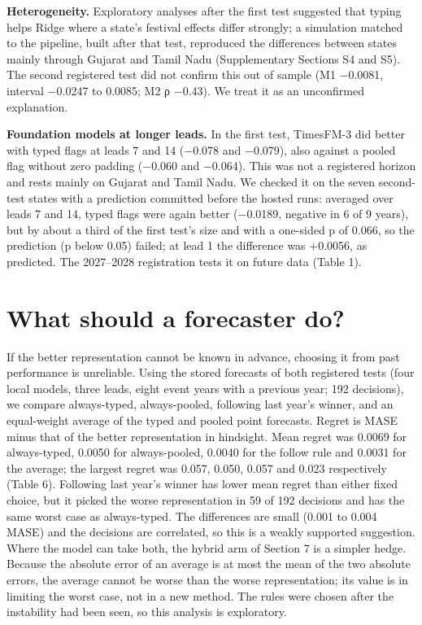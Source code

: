 \documentclass[review,12pt,authoryear]{elsarticle}
\begin{document}
\textbf{Heterogeneity.} Exploratory analyses after the first test suggested that typing helps Ridge where a state's festival effects differ strongly; a simulation matched to the pipeline, built after that test, reproduced the differences between states mainly through Gujarat and Tamil Nadu (Supplementary Sections S4 and S5). The second registered test did not confirm this out of sample (M1 −0.0081, interval −0.0247 to 0.0085; M2 ρ −0.43). We treat it as an unconfirmed explanation.

\textbf{Foundation models at longer leads.} In the first test, TimesFM-3 did better with typed flags at leads 7 and 14 (−0.078 and −0.079), also against a pooled flag without zero padding (−0.060 and −0.064). This was not a registered horizon and rests mainly on Gujarat and Tamil Nadu. We checked it on the seven second-test states with a prediction committed before the hosted runs: averaged over leads 7 and 14, typed flags were again better (−0.0189, negative in 6 of 9 years), but by about a third of the first test's size and with a one-sided p of 0.066, so the prediction (p below 0.05) failed; at lead 1 the difference was +0.0056, as predicted. The 2027--2028 registration tests it on future data (Table 1).

\section{What should a forecaster do?}

If the better representation cannot be known in advance, choosing it from past performance is unreliable. Using the stored forecasts of both registered tests (four local models, three leads, eight event years with a previous year; 192 decisions), we compare always-typed, always-pooled, following last year's winner, and an equal-weight average of the typed and pooled point forecasts. Regret is MASE minus that of the better representation in hindsight. Mean regret was 0.0069 for always-typed, 0.0050 for always-pooled, 0.0040 for the follow rule and 0.0031 for the average; the largest regret was 0.057, 0.050, 0.057 and 0.023 respectively (Table 6). Following last year's winner has lower mean regret than either fixed choice, but it picked the worse representation in 59 of 192 decisions and has the same worst case as always-typed. The differences are small (0.001 to 0.004 MASE) and the decisions are correlated, so this is a weakly supported suggestion. Where the model can take both, the hybrid arm of Section 7 is a simpler hedge. Because the absolute error of an average is at most the mean of the two absolute errors, the average cannot be worse than the worse representation; its value is in limiting the worst case, not in a new method. The rules were chosen after the instability had been seen, so this analysis is exploratory.
\end{document}
